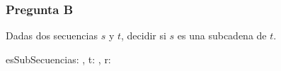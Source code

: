 \subsubsection{Pregunta B}

Dadas dos secuencias $s$ y $t$, decidir si $s$ es una subcadena de $t$.

\begin{proc}{esSubSecuencia}{\In s: , \In t: , \Out r: \bool}{}
\end{proc}










